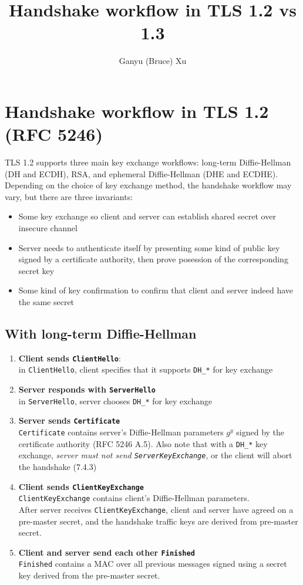 \documentclass{article}
\title{
    Handshake workflow in TLS 1.2 vs 1.3
}
\author{
    Ganyu (Bruce) Xu
}
\begin{document}
\maketitle

\section{Handshake workflow in TLS 1.2 (RFC 5246)}
TLS 1.2 supports three main key exchange workflows: long-term Diffie-Hellman (DH and ECDH), RSA, and ephemeral Diffie-Hellman (DHE and ECDHE). Depending on the choice of key exchange method, the handshake workflow may vary, but there are three invariants: \begin{itemize}
    \item Some key exchange so client and server can establish shared secret over insecure channel
    \item Server needs to authenticate itself by presenting some kind of public key signed by a certificate authority, then prove posession of the corresponding secret key
    \item Some kind of key confirmation to confirm that client and server indeed have the same secret
\end{itemize}

\subsection{With long-term Diffie-Hellman}
\begin{enumerate}
    \item \textbf{Client sends \texttt{ClientHello}}: \\ in \texttt{ClientHello}, client specifies that it supports \texttt{DH\_*} for key exchange
    \item \textbf{Server responds with \texttt{ServerHello}} \\ in \texttt{ServerHello}, server chooses \texttt{DH\_*} for key exchange
    \item \textbf{Server sends \texttt{Certificate}} \\ \texttt{Certificate} contains server's Diffie-Hellman parameters $g^y$ signed by the certificate authority (RFC 5246 A.5). Also note that with a \texttt{DH\_*} key exchange, \textit{server must not send \texttt{ServerKeyExchange}}, or the client will abort the handshake (7.4.3) 
    \item \textbf{Client sends \texttt{ClientKeyExchange}} \\ \texttt{ClientKeyExchange} contains client's Diffie-Hellman parameters. \\ After server receives \texttt{ClientKeyExchange}, client and server have agreed on a pre-master secret, and the handshake traffic keys are derived from pre-master secret. 
    \item \textbf{Client and server send each other \texttt{Finished}} \\ \texttt{Finished} contains a MAC over all previous messages signed using a secret key derived from the pre-master secret.
\end{enumerate}
\end{document}
